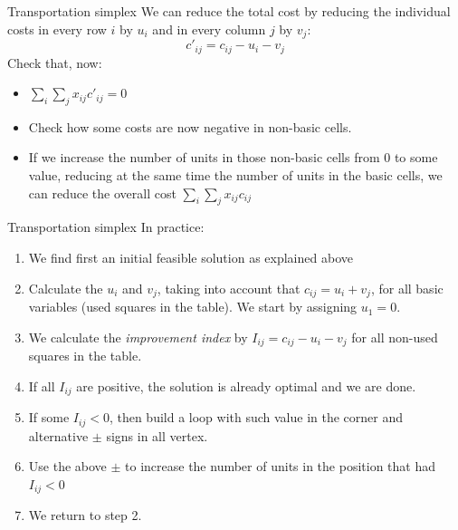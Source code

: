 \documentclass[c]{beamer}
\newcommand{\bottombox}[1]{\makebox[2em][r]{#1}\hspace*{\tabcolsep}\hspace*{2em}}%
\newcommand{\innerbox}[2]{%
    \begin{tabular}[b]{c|c}
       \rule{2em}{0pt}\rule[-2ex]{0pt}{5ex} & \makebox[2em]{#2} \\\cline{2-2}
       \multicolumn{2}{r}{{#1}\hspace*{1.5\tabcolsep}\hspace*{2em}\rule[-2ex]{0pt}{5ex}}
    \end{tabular}}
\begin{document}
\begin{frame}{Transportation simplex}
  We can reduce the total cost by reducing the individual costs in every row $i$ by $u_i$ and in every column $j$ by $v_j$:
  \[c'_{ij}=c_{ij}-u_i-v_j\]
  Check that, now:
  \begin{itemize}
    \item $\sum_i \sum_j x_{ij} c'_{ij}=0$
    \item Check how some costs are now negative in non-basic cells.
    \item If we increase the number of units in those non-basic cells from 0 to some value, reducing at the same time the number of units in the basic cells, we can reduce the overall cost $\sum_i \sum_j x_{ij} c_{ij}$
  \end{itemize}

\end{frame}

\begin{frame}{Transportation simplex}
In practice:
\begin{enumerate}
  \item We find first an initial feasible solution as explained above
  \item Calculate the $u_i$ and $v_j$, taking into account that $c_{ij}=u_i+v_j$, for all basic variables (used squares in the table). We start by assigning $u_1=0$.
  \item We calculate the {\em improvement index} by $I_{ij}=c_{ij}-u_i-v_j$ for all non-used squares in the table.
  \item If all $I_{ij}$ are positive, the solution is already optimal and we are done.
  \item If some $I_{ij}<0$, then build a loop with such value in the corner and alternative $\pm$ signs in all vertex.
  \item Use the above $\pm$ to increase the number of units in the position that had $I_{ij}<0$
  \item We return to step 2.
\end{enumerate}
\end{frame}

\end{document}
